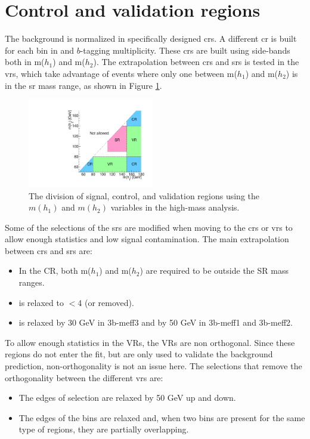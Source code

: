 \section{Control and validation regions}

The \ttbar background is normalized in specifically designed \glspl{cr}.
A different \gls{cr} is built for each bin in \meffb and $b$-tagging multiplicity. 
These \glspl{cr} are built using side-bands both in m($h_1$) and m($h_2$). 
The extrapolation between \glspl{cr} and \glspl{sr} is tested in the \glspl{vr}, which take advantage of events
where only one between m($h_1$) and m($h_2$) is in the \gls{sr} mass range, 
as shown in Figure \ref{fig:binning_crvr}.

\begin{figure}[htbp]
	\centering
	\includegraphics[width=0.490\textwidth]{figures/ewk_prod/varie/schema-1}
	\caption{The division of signal, control, and validation regions using the $m(h_1)$ and $m(h_2)$ variables in the high-mass analysis.}
	\label{fig:binning_crvr}
\end{figure}

Some of the selections of the \glspl{sr} are modified when moving to the \glspl{cr} or \glspl{vr}
 to allow enough statistics and low signal contamination.
The main extrapolation between \glspl{cr} and \glspl{sr} are:

\begin{itemize}
\item In the CR, both m($h_1$) and m($h_2$) are required to be outside the SR mass ranges.
\item \dRmax is relaxed to $<$4 (or removed).
\item \mtb is relaxed by 30 GeV in 3b-meff3 and by 50 GeV in 3b-meff1 and 3b-meff2.
\end{itemize}

To allow enough statistics in the VRs, the VRs are non orthogonal. Since these regions do not enter the fit, but are only used to validate the background prediction, non-orthogonality is not an issue here. 
The selections that remove the orthogonality between the different \glspl{vr} are:
\begin{itemize}
\item The edges of \meffb selection are relaxed by 50 GeV up and down.
\item The edges of the \dRmax bins are relaxed and, when two \dRmax bins are present for the same type of regions, they are partially overlapping.
\end{itemize}

